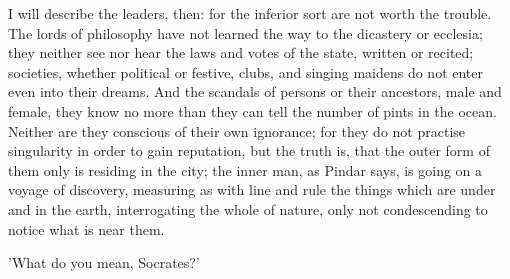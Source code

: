 I will describe the leaders, then: for the inferior sort are not worth
the trouble. The lords of philosophy have not learned the way to the
dicastery or ecclesia; they neither see nor hear the laws and votes of
the state, written or recited; societies, whether political or festive,
clubs, and singing maidens do not enter even into their dreams. And the
scandals of persons or their ancestors, male and female, they know no
more than they can tell the number of pints in the ocean. Neither
are they conscious of their own ignorance; for they do not practise
singularity in order to gain reputation, but the truth is, that the
outer form of them only is residing in the city; the inner man, as
Pindar says, is going on a voyage of discovery, measuring as with line
and rule the things which are under and in the earth, interrogating the
whole of nature, only not condescending to notice what is near them.

'What do you mean, Socrates?'

